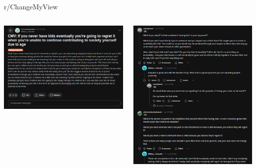 \documentclass[compress,12pt]{beamer}
\begin{document}
    \begin{frame}{r/ChangeMyView}
        \begin{columns}
            \begin{column}{0.5\textwidth}
                \includegraphics[width=\textwidth]{../images/cmv-example-op}
            \end{column}
            \begin{column}{0.5\textwidth}
                \includegraphics[width=\textwidth]{../images/cmv-example-thread}
            \end{column}
        \end{columns}
    \end{frame}
\end{document}
